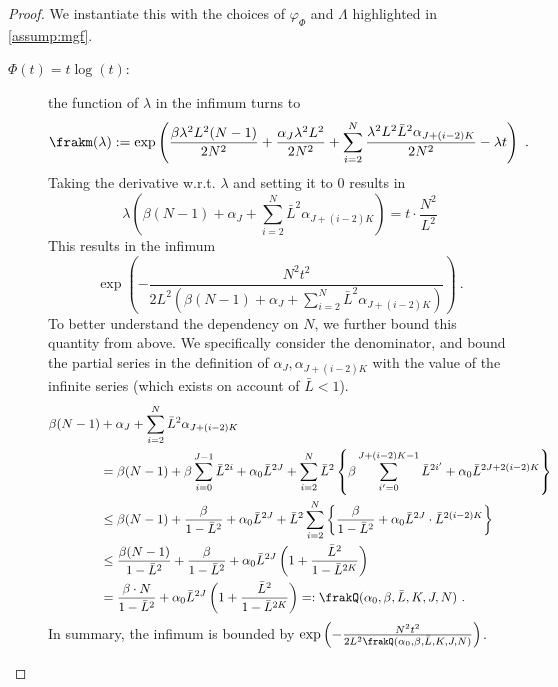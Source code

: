 \documentclass[11pt]{article}
\newcounter{ct}
\begin{document}
\begin{proof}
We instantiate this with the choices of \(\varphi_{\Phi}\) and \(\Lambda\) highlighted in \cref{assump:mgf}.
\begin{description}
    \item [\(\Phi(t) = t\log(t)\): ] the function of \(\lambda\) in the infimum turns to
    \begin{equation*}
        \frakm(\lambda) := \exp\left(\frac{\beta \lambda^{2}L^{2}(N - 1)}{2N^{2}} + \frac{\alpha_{J}\lambda^{2}L^{2}}{2N^{2}} + \sum_{i=2}^{N} \frac{\lambda^{2}L^{2}\bar{L}^{2}\alpha_{J + (i - 2)K}}{2N^{2}} - \lambda t\right)~.
    \end{equation*}
    Taking the derivative w.r.t. \(\lambda\) and setting it to \(0\) results in
    \begin{equation*}
        \lambda \left(\beta (N - 1) + \alpha_{J} + \sum_{i=2}^{N} \bar{L}^{2} \alpha_{J + (i - 2)K}\right) = t \cdot \frac{N^{2}}{L^{2}}
    \end{equation*}
    This results in the infimum
    \begin{equation*}
        \exp\left(-\frac{N^{2}t^{2}}{2L^{2}(\beta(N - 1) + \alpha_{J} + \sum_{i=2}^{N} \bar{L}^{2}\alpha_{J + (i - 2)K})}\right)~.
    \end{equation*}
    To better understand the dependency on \(N\), we further bound this quantity from above.
    We specifically consider the denominator, and bound the partial series in the definition of \(\alpha_{J}, \alpha_{J + (i - 2)K}\) with the value of the infinite series (which exists on account of \(\bar{L} < 1\)).
    \begin{align*}
        \beta(N - 1) &+ \alpha_{J} + \sum_{i=2}^{N} \bar{L}^{2}\alpha_{J + (i - 2)K} \\
        &= \beta(N - 1) + \beta\sum_{i=0}^{J -1}\bar{L}^{2i} + \alpha_{0}\bar{L}^{2J} + \sum_{i=2}^{N} \bar{L}^{2}\left\{\beta \sum_{i'=0}^{J + (i - 2)K - 1} \bar{L}^{2i'} + \alpha_{0}\bar{L}^{2J + 2(i - 2)K}\right\} \\
        &\leq \beta(N - 1) + \frac{\beta}{1 - \bar{L}^{2}} + \alpha_{0} \bar{L}^{2J} + \bar{L}^{2}\sum_{i=2}^{N}\left\{\frac{\beta}{1 - \bar{L}^{2}} + \alpha_{0}\bar{L}^{2J} \cdot \bar{L}^{2(i - 2)K}\right\} \\ 
        &\leq \frac{\beta(N - 1)}{1 - \bar{L}^{2}} + \frac{\beta}{1 - \bar{L}^{2}} + \alpha_{0}\bar{L}^{2J}\left(1 + \frac{\bar{L}^{2}}{1 - \bar{L}^{2K}}\right) \\
        &= \frac{\beta \cdot N}{1 - \bar{L}^{2}} + \alpha_{0}\bar{L}^{2J}\left(1 + \frac{\bar{L}^{2}}{1 - \bar{L}^{2K}} \right) =: \frakQ(\alpha_{0}, \beta, \bar{L}, K, J, N)~.
    \end{align*}
    In summary, the infimum is bounded by \(\exp\left(-\frac{N^{2}t^{2}}{2L^{2}\frakQ(\alpha_{0}, \beta, \bar{L}, K, J, N)}\right)\).
\end{description}

\end{proof}
\end{document}

